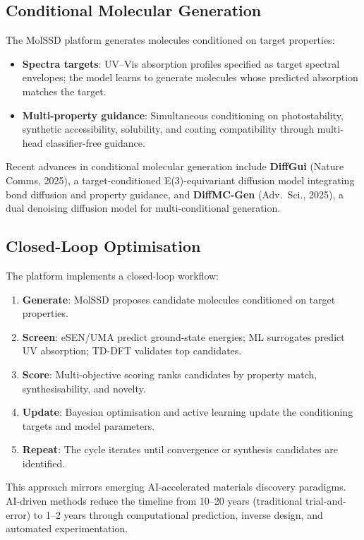 \documentclass[11pt,a4paper]{article}
\begin{document}
\subsection{Conditional Molecular Generation}

The MolSSD platform generates molecules conditioned on target properties:
\begin{itemize}[leftmargin=2em]
  \item \textbf{Spectra targets}: UV--Vis absorption profiles specified as
    target spectral envelopes; the model learns to generate molecules whose
    predicted absorption matches the target.
  \item \textbf{Multi-property guidance}: Simultaneous conditioning on
    photostability, synthetic accessibility, solubility, and coating
    compatibility through multi-head classifier-free guidance.
\end{itemize}

Recent advances in conditional molecular generation include
\textbf{DiffGui} (Nature Comms, 2025), a target-conditioned E(3)-equivariant
diffusion model integrating bond diffusion and property guidance, and
\textbf{DiffMC-Gen} (Adv.\ Sci., 2025), a dual denoising diffusion model
for multi-conditional generation.

\subsection{Closed-Loop Optimisation}

The platform implements a closed-loop workflow:
\begin{enumerate}[leftmargin=2em]
  \item \textbf{Generate}: MolSSD proposes candidate molecules conditioned on
    target properties.
  \item \textbf{Screen}: eSEN/UMA predict ground-state energies; ML
    surrogates predict UV absorption; TD-DFT validates top candidates.
  \item \textbf{Score}: Multi-objective scoring ranks candidates by property
    match, synthesisability, and novelty.
  \item \textbf{Update}: Bayesian optimisation and active learning update the
    conditioning targets and model parameters.
  \item \textbf{Repeat}: The cycle iterates until convergence or synthesis
    candidates are identified.
\end{enumerate}

This approach mirrors emerging AI-accelerated materials discovery paradigms.
AI-driven methods reduce the timeline from 10--20 years (traditional
trial-and-error) to 1--2 years through computational prediction, inverse
design, and automated experimentation.
\end{document}
